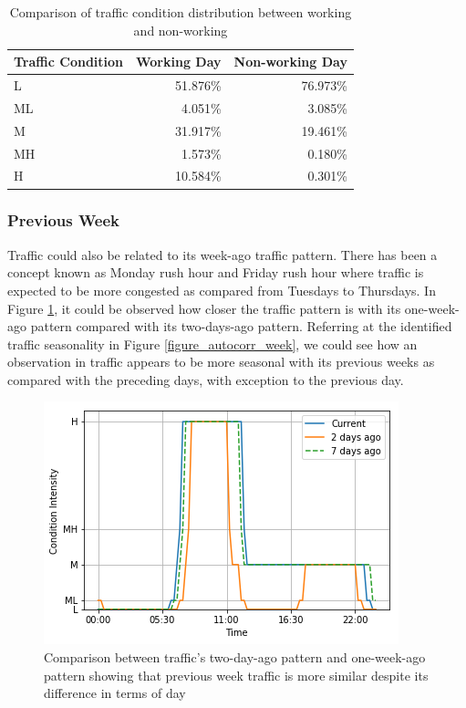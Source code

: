 \begin{table}[h]
\centering
\caption{Comparison of traffic condition distribution between working and non-working}
\label{table_traffic_cond_workingday}
\begin{tabular}{|l|r|r|}
\hline
\textbf{Traffic Condition} & \textbf{Working Day} & \textbf{Non-working Day} \\ \hline
L                          & 51.876\%             & 76.973\%                 \\ \hline
ML                         & 4.051\%              & 3.085\%                  \\ \hline
M                          & 31.917\%             & 19.461\%                 \\ \hline
MH                         & 1.573\%              & 0.180\%                  \\ \hline
H                          & 10.584\%             & 0.301\%                  \\ \hline
\end{tabular}
\end{table}

\subsubsection{Previous Week}
Traffic could also be related to its week-ago traffic pattern. There has been a concept known as Monday rush hour and Friday rush hour where traffic is expected to be more congested as compared from Tuesdays to Thursdays. In Figure \ref{figure_traffic_day_vs_week}, it could be observed how closer the traffic pattern is with its one-week-ago pattern compared with its two-days-ago pattern. Referring at the identified traffic seasonality in Figure \ref{figure_autocorr_week}, we could see how an observation in traffic appears to be more seasonal with its previous weeks as compared with the preceding days, with exception to the previous day.



\begin{figure}
  \includegraphics[width=\linewidth]{figures/figure_traffic_day_vs_week.png}
  \caption{Comparison between traffic’s two-day-ago pattern and one-week-ago pattern showing that previous week traffic is more similar despite its difference in terms of day}
  \label{figure_traffic_day_vs_week}
\end{figure}

